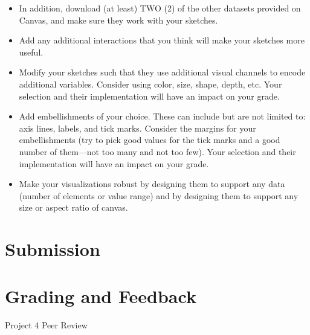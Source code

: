 \documentclass[a4paper,12pt]{article}
\begin{document}
\begin{itemize}
\item In addition, download (at least) TWO (2) of the other datasets provided on Canvas, and make sure they work with your sketches.

\item Add any additional interactions that you think will make your sketches more useful.

\item Modify your sketches such that they use additional visual channels to encode additional variables. Consider using color, size, shape, depth, etc. Your selection and their implementation will have an impact on your grade.

\item Add embellishments of your choice. These can include but are not limited to: axis lines, labels, and tick marks. Consider the margins for your embellishments (try to pick good values for the tick marks and a good number of them---not too many and not too few). Your selection and their implementation will have an impact on your grade.

\item Make your visualizations robust by designing them to support any data (number of elements or value range) and by designing them to support any size or aspect ratio of canvas.

\end{itemize}


\section{Submission}


\section{Grading and Feedback}

\feedback







\newpage


\begin{center}
{\huge Project 4 Peer Review}
\end{center}




\end{document}

